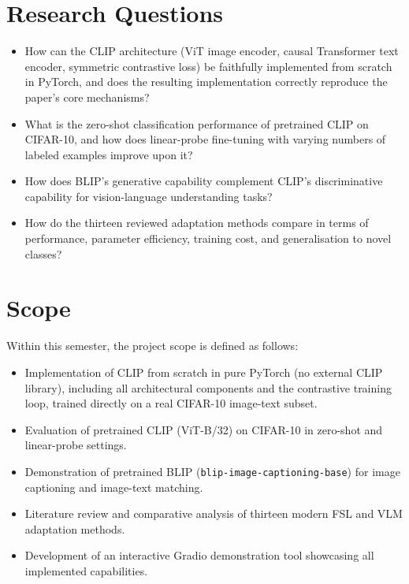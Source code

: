 \documentclass{iutbscthesis}
\begin{document}
\section{Research Questions}

\begin{itemize}
    \item How can the CLIP architecture (ViT image encoder, causal Transformer text encoder, symmetric contrastive loss) be faithfully implemented from scratch in PyTorch, and does the resulting implementation correctly reproduce the paper's core mechanisms?
    \item What is the zero-shot classification performance of pretrained CLIP on CIFAR-10, and how does linear-probe fine-tuning with varying numbers of labeled examples improve upon it?
    \item How does BLIP's generative capability complement CLIP's discriminative capability for vision-language understanding tasks?
    \item How do the thirteen reviewed adaptation methods compare in terms of performance, parameter efficiency, training cost, and generalisation to novel classes?
\end{itemize}

\section{Scope}

Within this semester, the project scope is defined as follows:

\begin{itemize}
    \item Implementation of CLIP from scratch in pure PyTorch (no external CLIP library), including all architectural components and the contrastive training loop, trained directly on a real CIFAR-10 image-text subset.
    \item Evaluation of pretrained CLIP (ViT-B/32) on CIFAR-10 in zero-shot and linear-probe settings.
    \item Demonstration of pretrained BLIP (\texttt{blip-image-captioning-base}) for image captioning and image-text matching.
    \item Literature review and comparative analysis of thirteen modern FSL and VLM adaptation methods.
    \item Development of an interactive Gradio demonstration tool showcasing all implemented capabilities.
\end{itemize}
\end{document}
